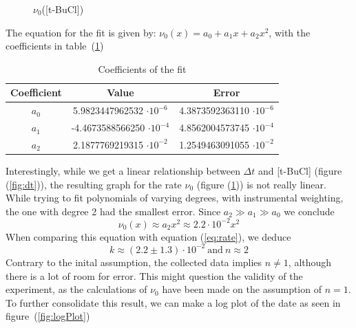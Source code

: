 \documentclass[12pt]{article}
\begin{document}
\begin{figure}[!ht]
    \centering
    \caption{$\nu_0$([t-BuCl])}
    \label{fig:nu0}
\end{figure}
\FloatBarrier

\noindent The equation for the fit is given by: $\nu_0(x) = a_0 + a_1x +a_2x^2$, with the coefficients in table~(\ref{tab:CoeffsFit})
\begin{table}[!ht]
    \centering
    \begin{tabular}{c|c|c}
        Coefficient & Value & Error \\ \hline
        $a_0$ &  5.9823447962532 $\cdot 10^{-6}$ & 4.3873592363110 $\cdot 10^{-6}$ \\
        $a_1$ & -4.4673588566250 $\cdot 10^{-4}$ & 4.8562004573745 $\cdot 10^{-4}$ \\   
        $a_2$ &  2.1877769219315 $\cdot 10^{-2}$ & 1.2549463091055 $\cdot 10^{-2}$ 
    \end{tabular}
    \caption{Coefficients of the fit}
    \label{tab:CoeffsFit}
\end{table}

\noindent Interestingly, while we get a linear relationship between $\Delta t$ and [t-BuCl] (figure (\ref{fig:dt})), the resulting graph for the rate $\nu_0$ (figure (\ref{fig:nu0})) is not really linear. While trying to fit polynomials of varying degrees, with instrumental weighting, the one with degree 2 had the smallest error. Since $a_2 \gg a_1 \gg a_0$ we conclude \[ \nu_0(x) \approx a_2 x^2 \approx 2.2 \cdot 10^{-2} x^2\] When comparing this equation with equation (\ref{eq:rate}), we deduce \[\boxed{k \approx (2.2 \pm 1.3) \cdot 10^{-2}} \ \text{and} \ \boxed{n \approx 2}\] Contrary to the inital assumption, the collected data implies $n \neq 1$, although there is a lot of room for error. This might question the validity of the experiment, as the calculations of $\nu_0$ have been made on the assumption of $n=1$. To further consolidate this result, we can make a log plot of the date as seen in figure~(\ref{fig:logPlot})
\end{document}
